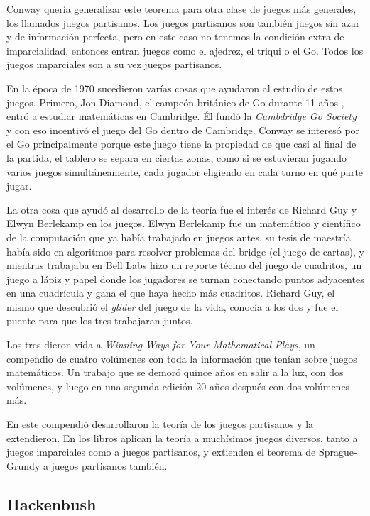 Conway quer\'ia generalizar este teorema para otra clase de juegos m\'as generales, los llamados juegos partisanos. Los juegos partisanos son tambi\'en juegos sin azar y de informaci\'on perfecta, pero en este caso no tenemos la condici\'on extra de imparcialidad, entonces entran juegos como el ajedrez, el triqui o el Go. Todos los juegos imparciales son a su vez juegos partisanos.

En la \'epoca de 1970 sucedieron var\'ias cosas que ayudaron al estudio de estos juegos. Primero, Jon Diamond, el campe\'on brit\'anico de Go durante 11 a\~nos \cite{britgo_JON_DIAMOND}, entr\'o a estudiar matem\'aticas en Cambridge. \'El fund\'o la \textit{Cambdridge Go Society} y con eso incentiv\'o el juego del Go dentro de Cambridge. Conway se interes\'o por el Go principalmente porque este juego tiene la propiedad de que casi al final de la partida, el tablero se separa en ciertas zonas, como si se estuvieran jugando varios juegos simult\'aneamente, cada jugador eligiendo en cada turno en qu\'e parte jugar.

La otra cosa que ayud\'o al desarrollo de la teor\'ia fue el inter\'es de Richard Guy y Elwyn Berlekamp en los juegos. Elwyn Berlekamp fue un matem\'atico y cient\'ifico de la computaci\'on que ya hab\'ia trabajado en juegos antes, su tesis de maestr\'ia hab\'ia sido en algoritmos para resolver problemas del bridge (el juego de cartas), y mientras trabajaba en Bell Labs hizo un reporte t\'ecino del juego de cuadritos, un juego a l\'apiz y papel donde los jugadores se turnan conectando puntos adyacentes en una cuadr\'icula y gana el que haya hecho m\'as cuadritos. Richard Guy, el mismo que descubri\'o el \textit{glider} del juego de la vida, conoc\'ia a los dos y fue el puente para que los tres trabajaran juntos.

Los tres dieron vida a \textit{Winning Ways for Your Mathematical Plays}, un compendio de cuatro vol\'umenes con toda la informaci\'on que ten\'ian sobre juegos matem\'aticos. Un trabajo que se demor\'o quince a\~nos en salir a la luz, con dos vol\'umenes, y luego en una segunda edici\'on 20 a\~nos despu\'es con dos vol\'umenes m\'as.

En este compendi\'o desarrollaron la teor\'ia de los juegos partisanos y la extendieron. En los libros aplican la teor\'ia a much\'isimos juegos diversos, tanto a juegos imparciales como a juegos partisanos, y extienden el teorema de Sprague-Grundy a juegos partisanos tambi\'en.

\subsection{Hackenbush}

